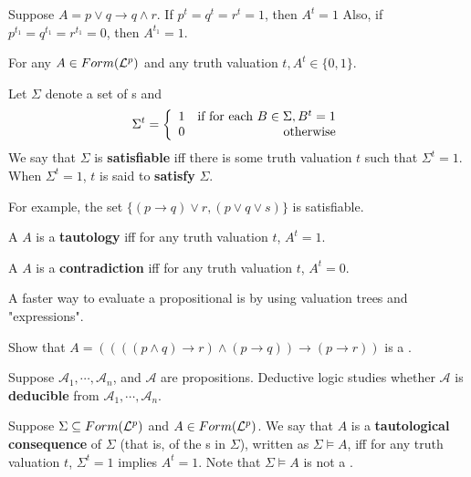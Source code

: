 \documentclass[english, 11pt]{article}
\begin{document}
  Suppose $A = p \lor q \rightarrow q \land r$. If $p^t = q^t = r^t = 1$, then $A^t = 1$ Also, if $p^{t_1} = q^{t_1} = r^{t_1} = 0$, then $A^{t_1} = 1$.

  \begin{thrm}\label{formdomain}
    For any $A \in Form(\mathcal{L}^p)$ and any truth valuation $t, A^t \in \{ 0, 1 \}.$
  \end{thrm}

  \begin{defn}[satisfiable]\label{satisfiable}
    Let $\Sigma$ denote a set of s and
    \[ \Sigma^t = \left\{ \begin{array}{lr} 1 & \mbox{if for each $B \in \Sigma, B^t = 1$} \\ 0 & \mbox{otherwise} \end{array} \right. \]
    We say that $\Sigma$ is \textbf{satisfiable} iff there is some truth valuation $t$ such that $\Sigma^t = 1$. When $\Sigma^t = 1$, $t$ is said to \textbf{satisfy} $\Sigma$.
  \end{defn}

  For example, the set $\{(p \rightarrow q) \lor r, (p \lor q \lor s ) \}$ is satisfiable.

  \begin{defn}[tautology]\label{tautology}
    A  $A$ is a \textbf{tautology} iff for any truth valuation $t$, $A^t = 1$.
  \end{defn}

  \begin{defn}[contradiction]\label{contradiction}
    A  $A$ is a \textbf{contradiction} iff for any truth valuation $t$, $A^t = 0$.
  \end{defn}

  A faster way to evaluate a propositional  is by using valuation trees and "expressions".

  \begin{exmp}
    Show that $A = ((((p\land q) \rightarrow r)\land (p \rightarrow q))\rightarrow (p \rightarrow r))$ is a .
  \end{exmp}

  \begin{defn}[deducible]\label{deducible}
    Suppose $\mathcal{A}_1, \cdots, \mathcal{A}_n$, and $\mathcal{A}$ are propositions. Deductive logic studies whether $\mathcal{A}$ is \textbf{deducible} from $\mathcal{A}_1,\cdots,\mathcal{A}_n$.
  \end{defn}

  \begin{defn}\label{tautologicalconsequence}
    Suppose $\Sigma \subseteq Form(\mathcal{L}^p)$ and $A \in Form (\mathcal{L}^p)$. We say that $A$ is a \textbf{tautological consequence} of $\Sigma$ (that is, of the s in $\Sigma$), written as $\Sigma \models A$, iff for any truth valuation $t$, $\Sigma^t = 1$ implies $A^t = 1$. Note that $\Sigma \models A$ is not a .
  \end{defn}
\end{document}
